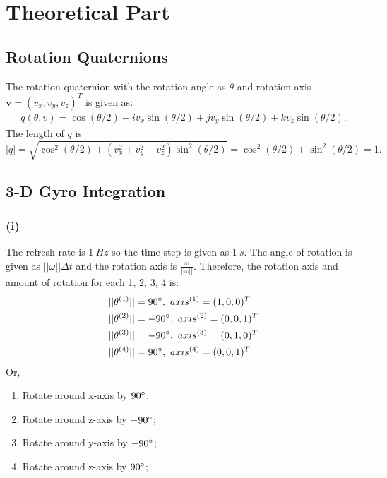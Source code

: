 \documentclass[11pt]{article}
\begin{document}
 


\section{Theoretical Part}
\subsection{Rotation Quaternions}
The rotation quaternion with the rotation angle as $\theta$ and rotation axis $\textbf{v} = (v_x, v_y, v_z)^T $ is given as:
\begin{align}
    q(\theta,v) = \cos(\theta/2) + i v_x \sin(\theta/2) + j v_y \sin(\theta/2) + k v_z \sin(\theta/2).
\end{align}
The length of $q$ is \[|q| = \sqrt{\cos^2(\theta/2)+( v_x^2 + v_y^2 + v_z^2) \sin^2(\theta/2)} = \cos^2(\theta/2) + \sin^2(\theta/2) = 1.\]

\subsection{3-D Gyro Integration}
\subsubsection*{(i)}
The refresh rate is $1\ Hz$ so the time step is given as $1\ s$. The angle of rotation is given as $||\omega||\Delta{t}$ and the rotation axis is $\frac{\omega}{||\omega||}$. Therefore, the rotation axis and amount of rotation for each 1, 2, 3, 4 is:
\begin{align*}
    & ||\theta^{(1)}|| = 90 \degree,\ axis^{(1)}=(1,0,0)^T\\
    & ||\theta^{(2)}|| = -90 \degree,\ axis^{(2)}=(0,0,1)^T\\
    & ||\theta^{(3)}|| = -90 \degree,\ axis^{(3)}=(0,1,0)^T\\
    & ||\theta^{(4)}|| = 90 \degree,\ axis^{(4)}=(0,0,1)^T
\end{align*}
Or,
\begin{enumerate}
    \item Rotate around x-axis by $90 \degree$;
    \item Rotate around z-axis by $-90 \degree$;
    \item Rotate around y-axis by $-90 \degree$;
    \item Rotate around z-axis by $90 \degree$;
\end{enumerate}
\end{document}
